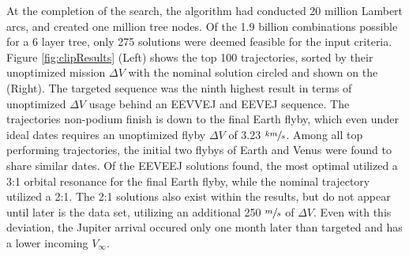 \documentclass[letterpaper, preprint, paper,11pt]{AAS}	%
\begin{document}
At the completion of the search, the algorithm had conducted 20 million Lambert arcs, and created one million tree nodes. Of the 1.9 billion combinations possible for a 6 layer tree, only 275 solutions were deemed feasible for the input criteria. Figure \ref*{fig:clipResults} (Left) shows the top 100 trajectories, sorted by their unoptimized mission $\Delta V$ with the nominal solution circled and shown on the (Right). The targeted sequence was the ninth highest result in terms of unoptimized $\Delta V$ usage behind an EEVVEJ and EEVEJ sequence. The trajectories non-podium finish is down to the final Earth flyby, which even under ideal dates requires an unoptimized flyby $\Delta V$ of 3.23 $\sfrac{km}{s}$. Among all top performing trajectories, the initial two flybys of Earth and Venus were found to share similar dates. Of the EEVEEJ solutions found, the most optimal utilized a 3:1 orbital resonance for the final Earth flyby, while the nominal trajectory utilized a 2:1. The 2:1 solutions also exist within the results, but do not appear until later is the data set, utilizing an additional 250 $\sfrac{m}{s}$ of $\Delta V$. Even with this deviation, the Jupiter arrival occured only one month later than targeted and has a lower incoming $V_\infty$.
\end{document}
